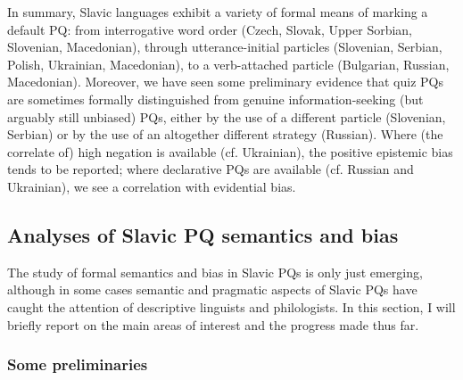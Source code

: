 \documentclass[output=paper,colorlinks,citecolor=brown]{langscibook}
\begin{document}
\ea\label{sim:ex:just-rus}
\z\z

\noindent In summary, Slavic languages exhibit a variety of formal means of marking a default PQ: from interrogative word order (Czech, Slovak, Upper Sorbian, Slovenian, Macedonian), through utterance-initial particles (Slovenian, Serbian, Polish, Ukrainian, Macedonian), to a verb-attached particle (Bulgarian, Russian, Macedonian). Moreover, we have seen some preliminary evidence that quiz PQs are sometimes formally distinguished from genuine information-seeking (but argu\-ably still unbiased) PQs, either by the use of a different particle (Slovenian, Serbian) or by the use of an altogether different strategy (Russian). Where (the correlate of) high negation is available (cf. Ukrainian), the positive epistemic bias tends to be reported; where declarative PQs are available (cf. Russian and Ukrainian), we see a correlation with evidential bias.

\subsection{Analyses of Slavic PQ semantics and bias}

The study of formal semantics and bias in Slavic PQs is only just emerging, although in some cases semantic and pragmatic aspects of Slavic PQs have caught the attention of descriptive linguists and philologists. In this section, I will briefly report on the main areas of interest and the progress made thus far.

\subsubsection{Some preliminaries}\label{sim:sec:anal-prelim}
\end{document}
